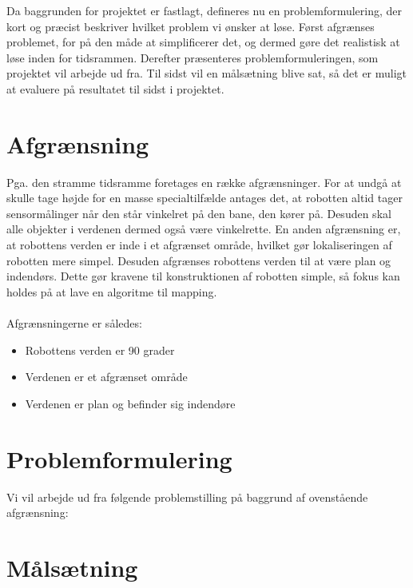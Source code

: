 Da baggrunden for projektet er fastlagt, defineres nu en problemformulering, der kort og præcist beskriver hvilket problem vi ønsker at løse.
Først afgrænses problemet, for på den måde at simplificerer det, og dermed gøre det realistisk at løse inden for tidsrammen.
Derefter præsenteres problemformuleringen, som projektet vil arbejde ud fra.
Til sidst vil en målsætning blive sat, så det er muligt at evaluere på resultatet til sidst i projektet.

\section*{Afgrænsning}
Pga. den stramme tidsramme foretages en række afgrænsninger.
For at undgå at skulle tage højde for en masse specialtilfælde antages det, at robotten altid tager sensormålinger når den står vinkelret på den bane, den kører på.
Desuden skal alle objekter i verdenen dermed også være vinkelrette. 
En anden afgrænsning er, at robottens verden er inde i et afgrænset område, hvilket gør lokaliseringen af robotten mere simpel.
Desuden afgrænses robottens verden til at være plan og indendørs. 
Dette gør kravene til konstruktionen af robotten simple, så fokus kan holdes på at lave en algoritme til mapping.

\paragraph{}
 Afgrænsningerne er således:
\begin{itemize}
\item Robottens verden er 90 grader
\item Verdenen er et afgrænset område
\item Verdenen er plan og befinder sig indendøre
\end{itemize}

\section*{Problemformulering}\label{problemformulering}
Vi vil arbejde ud fra følgende problemstilling på baggrund af ovenstående afgrænsning:

\begin{samepage}


\end{samepage}

\section*{Målsætning}\label{problem:maalsaetning}
